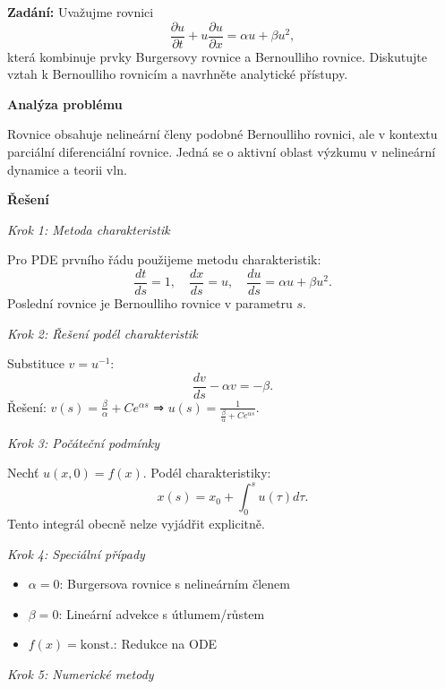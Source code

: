 \begin{example}
\label{ex:l2-e3-propojeni-pde}

\noindent\textbf{Zadání:} Uvažujme rovnici
\[
\frac{\partial u}{\partial t} + u\frac{\partial u}{\partial x} = \alpha u + \beta u^2,
\]
která kombinuje prvky Burgersovy rovnice a Bernoulliho rovnice. Diskutujte vztah 
k Bernoulliho rovnicím a navrhněte analytické přístupy.

\vspace{1.5\baselineskip}

\noindent\textbf{Analýza problému}

\noindent Rovnice obsahuje nelineární členy podobné Bernoulliho rovnici, ale 
v kontextu parciální diferenciální rovnice. Jedná se o aktivní oblast výzkumu 
v nelineární dynamice a teorii vln.

\vspace{1.5\baselineskip}

\noindent\textbf{Řešení}

\noindent\textit{Krok 1: Metoda charakteristik}

Pro PDE prvního řádu použijeme metodu charakteristik:
\[
\frac{dt}{ds} = 1, \quad \frac{dx}{ds} = u, \quad \frac{du}{ds} = \alpha u + \beta u^2.
\]
Poslední rovnice je Bernoulliho rovnice v parametru $s$.

\noindent\textit{Krok 2: Řešení podél charakteristik}

Substituce $v = u^{-1}$:
\[
\frac{dv}{ds} - \alpha v = -\beta.
\]
Řešení: $v(s) = \frac{\beta}{\alpha} + Ce^{\alpha s}$ ⇒ $u(s) = \frac{1}{\frac{\beta}{\alpha} + Ce^{\alpha s}}$.

\noindent\textit{Krok 3: Počáteční podmínky}

Nechť $u(x,0) = f(x)$. Podél charakteristiky:
\[
x(s) = x_0 + \int_0^s u(\tau)d\tau.
\]
Tento integrál obecně nelze vyjádřit explicitně.

\noindent\textit{Krok 4: Speciální případy}

\begin{itemize}
\item $\alpha = 0$: Burgersova rovnice s nelineárním členem
\item $\beta = 0$: Lineární advekce s útlumem/růstem
\item $f(x) = \text{konst.}$: Redukce na ODE
\end{itemize}

\noindent\textit{Krok 5: Numerické metody}


\end{example}
